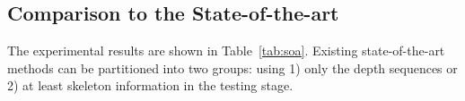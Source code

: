 \documentclass[10pt,twocolumn,letterpaper]{article}
\begin{document}
%
%
%
%
%
%
%
%


\vspace{-0.1cm}
\subsection{Comparison to the State-of-the-art}
\vspace{-0.1cm}
The experimental results are shown in Table~\ref{tab:soa}. Existing state-of-the-art methods can be partitioned into two groups: using 1) only the depth sequences or 2) at least skeleton information in the testing stage.
\end{document}
